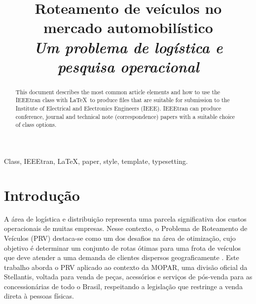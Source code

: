 \documentclass[conference]{IEEEtran}
\begin{document}
\title{Roteamento de veículos no mercado automobilístico\\[0.5ex]
\large \textit{Um problema de logística e pesquisa operacional}}
\author{
\and
{}
\and
{}
}

\maketitle

\begin{abstract}
This document describes the most common article elements and how to use the IEEEtran class with \LaTeX \ to produce files that are suitable for submission to the Institute of Electrical and Electronics Engineers (IEEE).  IEEEtran can produce conference, journal and technical note (correspondence) papers with a suitable choice of class options.
\end{abstract}

\begin{IEEEkeywords}
Class, IEEEtran, \LaTeX, paper, style, template, typesetting.
\end{IEEEkeywords}


\section{Introdução}
A área de logística e distribuição representa uma parcela significativa dos custos operacionais de muitas empresas. 
Nesse contexto, o Problema de Roteamento de Veículos (PRV) destaca-se como um dos 
desafios na área de otimização, cujo objetivo é determinar um conjunto de rotas 
ótimas para uma frota de veículos que deve atender a uma demanda de clientes 
dispersos geograficamente \cite{livro}. Este trabalho aborda o PRV aplicado ao contexto da MOPAR,
uma divisão oficial da Stellantis, voltada para venda de peças, acessórios e serviços de pós-venda para as concessionárias
de todo o Brasil, respeitando a legislação que restringe a venda direta à pessoas físicas\cite{mopar}.
\end{document}
